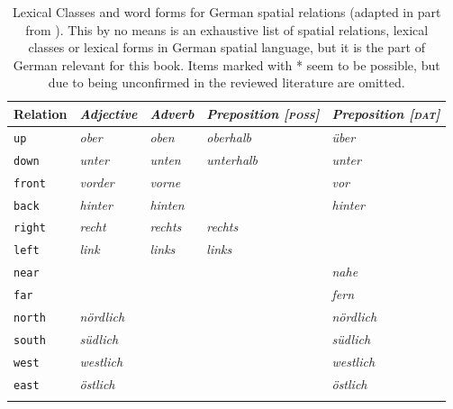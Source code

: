 \begin{table}
\label{t:lexical-class-word-forms}
\caption[Lexical Classes and word forms for German spatial relations]
{Lexical Classes and word forms for German spatial relations 
(adapted in part from \citealt{tenbrink2007space}). This by no means
is an exhaustive list of spatial relations, lexical classes or lexical forms 
in German spatial language, but it is the part of German relevant for 
this book. Items marked with * seem to be possible, but due to being
unconfirmed in the reviewed literature are omitted.\newline}
\begin{tabular}{l>{\itshape}l>{\itshape}l>{\itshape}l>{\itshape}l}
\lsptoprule
Relation & \upshape Adjective & \upshape Adverb & \upshape Preposition [\textsc{poss}] & \upshape Preposition [\textsc{dat}] \\\midrule
{\footnotesize\tt up} & ober & oben & oberhalb & {\"u}ber \\%
{\footnotesize\tt down} & unter & unten & unterhalb & unter\\%
{\footnotesize\tt front} & vorder & vorne & \multicolumn{1}{c}{\upshape --} & vor \\%
{\footnotesize\tt back}  & hinter & hinten  & \multicolumn{1}{c}{\upshape --} & hinter\\%
{\footnotesize\tt right} & recht & rechts  & rechts & \multicolumn{1}{c}{\upshape --} \\%
{\footnotesize\tt left} & link & links & links & \multicolumn{1}{c}{\upshape --} \\%
{\footnotesize\tt near} & \multicolumn{1}{c}{\upshape *} & \multicolumn{1}{c}{\upshape --} & \multicolumn{1}{c}{\upshape --} & nahe \\%
{\footnotesize\tt far} & \multicolumn{1}{c}{\upshape *} & \multicolumn{1}{c}{\upshape --} & \multicolumn{1}{c}{\upshape --} & fern \\%
{\footnotesize\tt north}  & n\"ordlich & \multicolumn{1}{c}{\upshape *} & \multicolumn{1}{c}{\upshape *} & n\"ordlich \\%
{\footnotesize\tt south} & s\"udlich & \multicolumn{1}{c}{\upshape *} & \multicolumn{1}{c}{\upshape *} & s\"udlich \\%
{\footnotesize\tt west} & westlich & \multicolumn{1}{c}{\upshape *} & \multicolumn{1}{c}{\upshape *} & westlich \\%
{\footnotesize\tt east} & \"ostlich & \multicolumn{1}{c}{\upshape *} & \multicolumn{1}{c}{\upshape *} & \"ostlich \\%
\lspbottomrule
\end{tabular}
\end{table}

